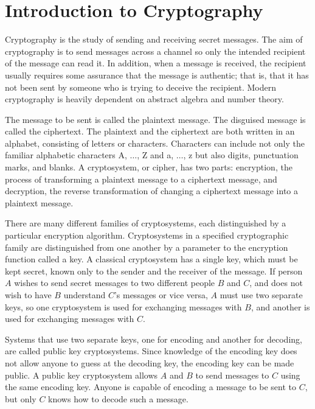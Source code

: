 \chapter{Introduction to Cryptography}\label{crypt}

Cryptography is the study of sending and receiving secret messages.
The aim of cryptography is to send messages across a channel so only
the intended recipient of the message can read it. In addition, when a
message is received, the recipient usually requires some assurance that
the message is authentic; that is, that it has not been sent by
someone who is trying to deceive the recipient. Modern cryptography is
heavily dependent on abstract algebra and number theory. 
 
 
The message to be sent is called the {\bfi
plaintext\/} message. The disguised message is called
the {\bfi ciphertext}. The plaintext and the
ciphertext are both written in an {\bfi alphabet}, consisting of {\bfi
letters\/} or {\bfi characters}. Characters can include not only the
familiar alphabetic characters A, $\ldots$, Z and a, $\ldots$, z but
also digits, punctuation marks, and blanks. A {\bfi
cryptosystem}, or {\bfi
cipher},  has two parts: {\bfi encryption}, the process
of transforming a plaintext message to a ciphertext message, and {\bfi
decryption}, the reverse transformation of changing a ciphertext
message into a plaintext message.
 
 
There are many different families of cryptosystems, each distinguished
by a particular encryption algorithm. Cryptosystems in a specified
cryptographic family are distinguished from one another by a parameter
to the encryption function called a {\bfi key}. A classical cryptosystem has a single key, which must be kept
secret,  known only to the sender and the receiver of the message. If
person $A$ wishes to send secret messages to two different people $B$
and $C$, and does not wish to have $B$ understand $C$'s messages or
vice versa, $A$ must use two separate keys, so one cryptosystem is
used for exchanging messages with $B$, and another is used for
exchanging messages with $C$.
 
 
Systems that use two separate keys, one for encoding and another for
decoding, are called {\bfi public key
cryptosystems}. Since
knowledge of the encoding key does not allow anyone to guess at the
decoding key, the encoding key can be made public. A public key
cryptosystem allows $A$ and $B$ to send messages to $C$ using the same
encoding key.  Anyone is capable of encoding a message to be sent to
$C$, but only $C$ knows how to decode such a message.
 
